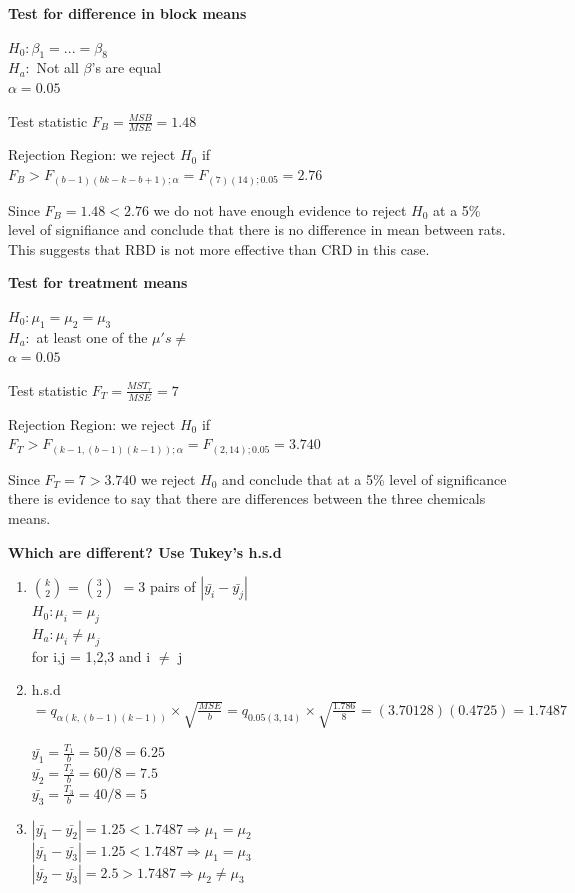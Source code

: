 \documentclass{article}
\begin{document}
\begin{enumerate}[1.]
\textbf{Test for difference in block means}

$H_0: \beta_1 = ... = \beta_8$ \\
$H_a:$ Not all $\beta$'s are equal \\
$\alpha = 0.05$

Test statistic $F_B = \frac{MSB}{MSE} = 1.48$ 

Rejection Region: we reject $H_0$ if $F_B > F_{(b-1)(bk - k - b + 1);\alpha} = F_{(7)(14);0.05} = 2.76$

Since $F_B = 1.48 < 2.76$ we do not have enough evidence to reject $H_0$ at a 5\% level of signifiance and conclude that there is no difference in mean between rats. This suggests that RBD is not more effective than CRD in this case. 

\textbf{Test for treatment means}

$H_0: \mu_1 = \mu_2 = \mu_3$ \\
$H_a:$ at least one of the $\mu's \neq$ \\
$\alpha = 0.05$

Test statistic $F_T = \frac{MST_r}{MSE} = 7$

Rejection Region: we reject $H_0$ if $F_T > F_{(k-1, (b-1)(k-1));\alpha} = F_{(2, 14);0.05} = 3.740$

Since $F_T =7 > 3.740$ we reject $H_0$ and conclude that at a 5\% level of significance there is evidence to say that there are differences between the three chemicals means.

\textbf{Which are different? Use Tukey's h.s.d}

\begin{enumerate}[1)]

\item $k \choose 2 $ = $3 \choose 2$ $= 3$ pairs of $|\bar{y_i} - \bar{y_j}|$ \\
$H_0: \mu_i = \mu_j$ \\
$H_a: \mu_i \neq \mu_j$ \\
for i,j = 1,2,3 and i $\neq$ j

\item h.s.d $ = q_{\alpha(k ,(b-1)(k-1))} \times \sqrt{ \frac{MSE}{b} } = q_{0.05(3, 14)} \times \sqrt{ \frac{1.786}{8}} = (3.70128)(0.4725) = 1.7487 $

$\bar{y_1} = \frac{T_1}{b} = 50/8 = 6.25$\\
$\bar{y_2} = \frac{T_2}{b} = 60/8 = 7.5$\\
$\bar{y_3} = \frac{T_3}{b} = 40/8 = 5$

\item $| \bar{y_1} - \bar{y_2} | = 1.25 < 1.7487 \Rightarrow \mu_1 = \mu_2$ \\
$| \bar{y_1} - \bar{y_3} | = 1.25 < 1.7487 \Rightarrow \mu_1 = \mu_3$ \\
$| \bar{y_2} - \bar{y_3} | = 2.5 > 1.7487 \Rightarrow \mu_2 \neq \mu_3$ \\


\end{enumerate}
\end{enumerate}
\end{document}
